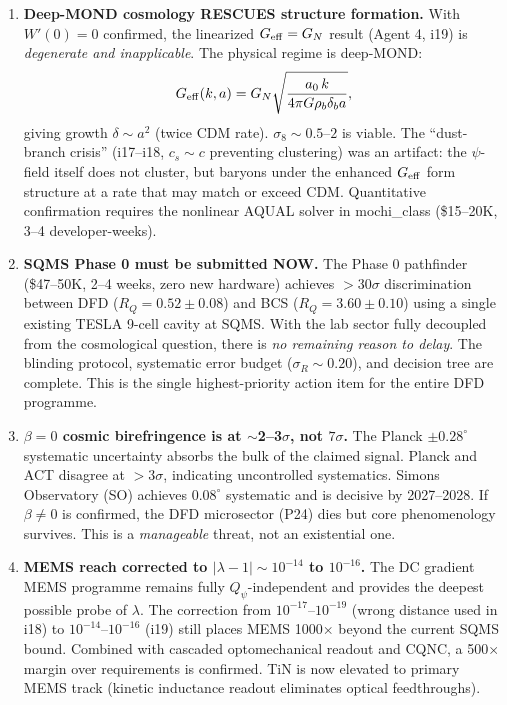 \documentclass[11pt]{article}
\begin{document}
\begin{enumerate}[label=\textbf{F\arabic*.}]

\item \textbf{Deep-MOND cosmology RESCUES structure formation.}
With $W'(0) = 0$ confirmed, the linearized $G_{\rm eff} = G_N$ result (Agent 4, i19)
is \emph{degenerate and inapplicable}. The physical regime is deep-MOND:
\[
G_{\rm eff}(k,a) = G_N \sqrt{\frac{a_0 \, k}{4\pi G \rho_b \delta_b a}},
\]
giving growth $\delta \sim a^2$ (twice CDM rate). $\sigma_8 \sim 0.5\text{--}2$
is viable. The ``dust-branch crisis'' (i17--i18, $c_s \sim c$ preventing clustering)
was an artifact: the $\psi$-field itself does not cluster, but baryons under
the enhanced $G_{\rm eff}$ form structure at a rate that may match or exceed CDM.
Quantitative confirmation requires the nonlinear AQUAL solver in mochi\_class
(\$15--20K, 3--4 developer-weeks).

\item \textbf{SQMS Phase 0 must be submitted NOW.}
The Phase 0 pathfinder (\$47--50K, 2--4 weeks, zero new hardware) achieves
$>30\sigma$ discrimination between DFD ($R_Q = 0.52 \pm 0.08$) and BCS
($R_Q = 3.60 \pm 0.10$) using a single existing TESLA 9-cell cavity at SQMS.
With the lab sector fully decoupled from the cosmological question, there is
\emph{no remaining reason to delay}. The blinding protocol, systematic error
budget ($\sigma_R \sim 0.20$), and decision tree are complete. This is the
single highest-priority action item for the entire DFD programme.

\item \textbf{$\beta = 0$ cosmic birefringence is at $\sim$2--3$\sigma$, not $7\sigma$.}
The Planck $\pm 0.28^\circ$ systematic uncertainty absorbs the bulk of the claimed
signal. Planck and ACT disagree at $>3\sigma$, indicating uncontrolled systematics.
Simons Observatory (SO) achieves $0.08^\circ$ systematic and is decisive by 2027--2028.
If $\beta \neq 0$ is confirmed, the DFD microsector (P24) dies but core phenomenology
survives. This is a \emph{manageable} threat, not an existential one.

\item \textbf{MEMS reach corrected to $|\lambda - 1| \sim 10^{-14}$ to $10^{-16}$.}
The DC gradient MEMS programme remains fully $Q_\psi$-independent and provides the
deepest possible probe of $\lambda$. The correction from $10^{-17}$--$10^{-19}$
(wrong distance used in i18) to $10^{-14}$--$10^{-16}$ (i19) still places MEMS
1000$\times$ beyond the current SQMS bound. Combined with cascaded optomechanical
readout and CQNC, a 500$\times$ margin over requirements is confirmed. TiN is now
elevated to primary MEMS track (kinetic inductance readout eliminates optical
feedthroughs).


\end{enumerate}
\end{document}
